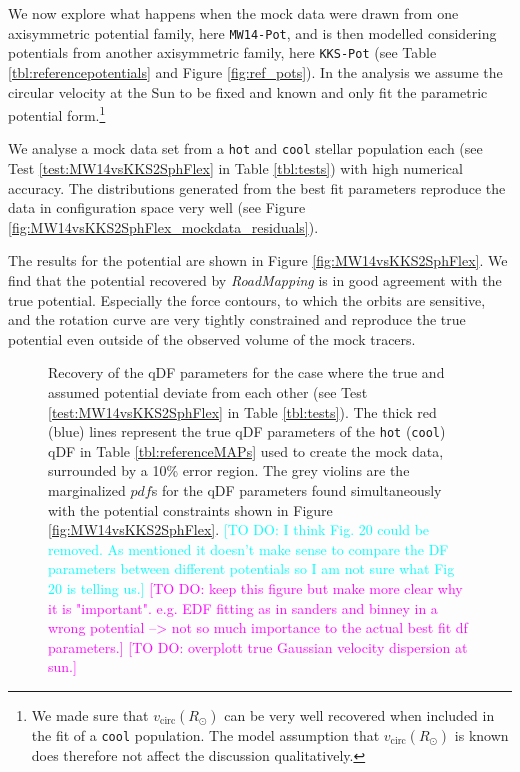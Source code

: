 \documentclass[iop,revtex4]{emulateapj}
\newcommand{\pdf}{\ensuremath{pdf}}
\newcommand{\RM}{{\sl RoadMapping}}
\newcommand{\HW}[1]{\textcolor{Cyan}{#1}}
\newcommand{\Wilma}[1]{\textcolor{Magenta}{#1}}
\begin{document}
We now explore what happens when the mock data were drawn from one axisymmetric potential family, here \texttt{MW14-Pot}, and is then modelled considering potentials from another axisymmetric family, here \texttt{KKS-Pot} (see Table \ref{tbl:referencepotentials} and Figure \ref{fig:ref_pots}). In the analysis we assume the circular velocity at the Sun to be fixed and known and only fit the parametric potential form.\footnote{We made sure that $v_\text{circ}(R_\odot)$ can be very well recovered when included in the fit of a \texttt{cool} population. The model assumption that $v_\text{circ}(R_\odot)$ is known does therefore not affect the discussion qualitatively.}

We analyse a mock data set from a \texttt{hot} and \texttt{cool} stellar population each (see Test \ref{test:MW14vsKKS2SphFlex} in Table \ref{tbl:tests}) with high numerical accuracy. The distributions generated from the best fit parameters reproduce the data in configuration space very well (see Figure \ref{fig:MW14vsKKS2SphFlex_mockdata_residuals}).

The results for the potential are shown in Figure \ref{fig:MW14vsKKS2SphFlex}. We find that the potential recovered by \RM{} is in good agreement with the true potential. Especially the force contours, to which the orbits are sensitive, and the rotation curve are very tightly constrained and reproduce the true potential even outside of the observed volume of the mock tracers.

\begin{figure}[!htb]
\caption{Recovery of the qDF parameters for the case where the true and assumed potential deviate from each other (see Test \ref{test:MW14vsKKS2SphFlex} in Table \ref{tbl:tests}). The thick red (blue) lines represent the true qDF parameters of the \texttt{hot} (\texttt{cool}) qDF in Table \ref{tbl:referenceMAPs} used to create the mock data, surrounded by a 10\% error region. The grey violins are the marginalized \pdf{}s for the qDF parameters found simultaneously with the potential constraints shown in Figure \ref{fig:MW14vsKKS2SphFlex}. \HW{[TO DO: I think Fig. 20 could be removed. As mentioned it doesn't make sense to compare the DF parameters between different potentials so I am not sure what Fig 20 is telling us.]} \Wilma{[TO DO: keep this figure but make more clear why it is "important". e.g. EDF fitting as in sanders and binney in a wrong potential --> not so much importance to the actual best fit df parameters.]} \Wilma{[TO DO: overplott true Gaussian velocity dispersion at sun.]}}
\label{fig:MW14vsKKS2SphFlex_violins}
\end{figure}
\end{document}
